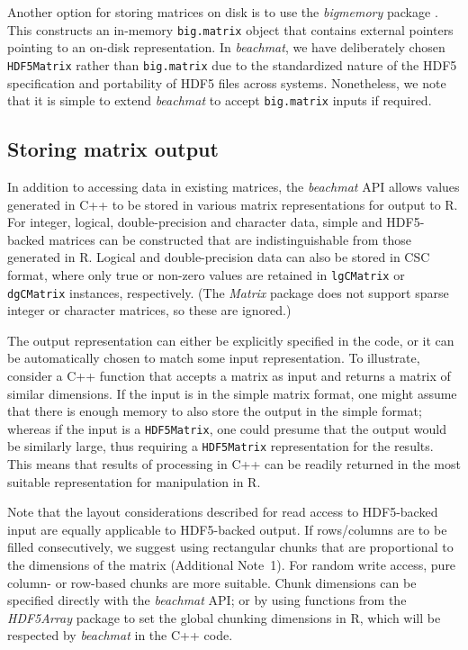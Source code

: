 \documentclass[10pt,letterpaper]{article}
\newcommand{\beachmat}{\textit{beachmat}}
\newcommand{\code}[1]{\texttt{#1}}
\newcommand{\suppseclayoutoptim}{1}
\begin{document}
Another option for storing matrices on disk is to use the \textit{bigmemory} package \cite{kane2013scalable}.
This constructs an in-memory \code{big.matrix} object that contains external pointers pointing to an on-disk representation.
In \beachmat{}, we have deliberately chosen \code{HDF5Matrix} rather than \code{big.matrix} due to the standardized nature of the HDF5 specification and portability of HDF5 files across systems.
Nonetheless, we note that it is simple to extend \beachmat{} to accept \code{big.matrix} inputs if required.

\subsection*{Storing matrix output}
In addition to accessing data in existing matrices, the \beachmat{} API allows values generated in C++ to be stored in various matrix representations for output to R.
For integer, logical, double-precision and character data, simple and HDF5-backed matrices can be constructed that are indistinguishable from those generated in R.
Logical and double-precision data can also be stored in CSC format, where only true or non-zero values are retained in \code{lgCMatrix} or \code{dgCMatrix} instances, respectively.
(The \textit{Matrix} package does not support sparse integer or character matrices, so these are ignored.)

The output representation can either be explicitly specified in the code, or it can be automatically chosen to match some input representation.
To illustrate, consider a C++ function that accepts a matrix as input and returns a matrix of similar dimensions.
If the input is in the simple matrix format, one might assume that there is enough memory to also store the output in the simple format;
whereas if the input is a \code{HDF5Matrix}, one could presume that the output would be similarly large, thus requiring a \code{HDF5Matrix} representation for the results.
This means that results of processing in C++ can be readily returned in the most suitable representation for manipulation in R.
 
Note that the layout considerations described for read access to HDF5-backed input are equally applicable to HDF5-backed output.
If rows/columns are to be filled consecutively, we suggest using rectangular chunks that are proportional to the dimensions of the matrix (Additional Note~\suppseclayoutoptim{}).
For random write access, pure column- or row-based chunks are more suitable.
Chunk dimensions can be specified directly with the \textit{beachmat} API; or by using functions from the \textit{HDF5Array} package to set the global chunking dimensions in R, which will be respected by \beachmat{} in the C++ code.
\end{document}

